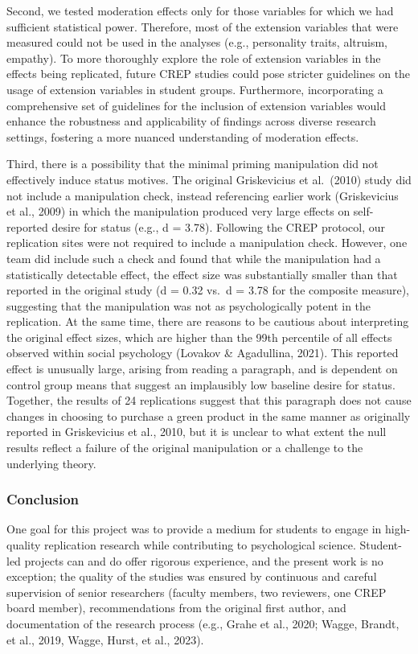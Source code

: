 \documentclass[
]{article}
\begin{document}
Second, we tested moderation effects only for those variables for which
we had sufficient statistical power. Therefore, most of the extension
variables that were measured could not be used in the analyses (e.g.,
personality traits, altruism, empathy). To more thoroughly explore the
role of extension variables in the effects being replicated, future CREP
studies could pose stricter guidelines on the usage of extension
variables in student groups. Furthermore, incorporating a comprehensive
set of guidelines for the inclusion of extension variables would enhance
the robustness and applicability of findings across diverse research
settings, fostering a more nuanced understanding of moderation effects.

Third, there is a possibility that the minimal priming manipulation did
not effectively induce status motives. The original Griskevicius et
al.~(2010) study did not include a manipulation check, instead
referencing earlier work (Griskevicius et al., 2009) in which the
manipulation produced very large effects on self-reported desire for
status (e.g., d = 3.78). Following the CREP protocol, our replication
sites were not required to include a manipulation check. However, one
team did include such a check and found that while the manipulation had
a statistically detectable effect, the effect size was substantially
smaller than that reported in the original study (d = 0.32 vs.~d = 3.78
for the composite measure), suggesting that the manipulation was not as
psychologically potent in the replication. At the same time, there are
reasons to be cautious about interpreting the original effect sizes,
which are higher than the 99th percentile of all effects observed within
social psychology (Lovakov \& Agadullina, 2021). This reported effect is
unusually large, arising from reading a paragraph, and is dependent on
control group means that suggest an implausibly low baseline desire for
status. Together, the results of 24 replications suggest that this
paragraph does not cause changes in choosing to purchase a green product
in the same manner as originally reported in Griskevicius et al., 2010,
but it is unclear to what extent the null results reflect a failure of
the original manipulation or a challenge to the underlying theory.

\subsubsection{Conclusion}\label{conclusion}

One goal for this project was to provide a medium for students to engage
in high-quality replication research while contributing to psychological
science. Student-led projects can and do offer rigorous experience, and
the present work is no exception; the quality of the studies was ensured
by continuous and careful supervision of senior researchers (faculty
members, two reviewers, one CREP board member), recommendations from the
original first author, and documentation of the research process (e.g.,
Grahe et al., 2020; Wagge, Brandt, et al., 2019, Wagge, Hurst, et al.,
2023).
\end{document}
